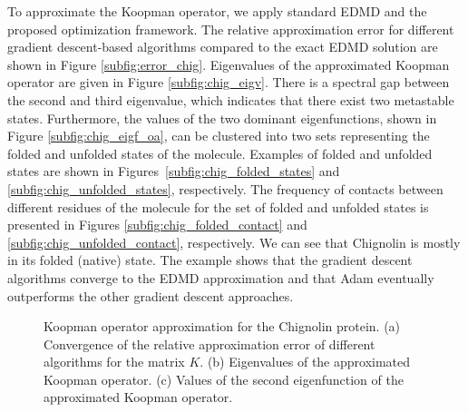 \documentclass
[
    a4paper,
    DIV=11,
    abstract=true,
    11pt,
]
{scrartcl}
\theoremstyle{definition}
\begin{document}
To approximate the Koopman operator, we apply standard EDMD and the proposed optimization framework. The relative approximation error for different gradient descent-based algorithms compared to the exact EDMD solution are shown in Figure \ref{subfig:error_chig}. Eigenvalues of the approximated Koopman operator are given in Figure \ref{subfig:chig_eigv}. There is a spectral gap between the second and third eigenvalue, which indicates that there exist two metastable states. Furthermore, the values of the two dominant eigenfunctions, shown in Figure \ref{subfig:chig_eigf_oa}, can be clustered into two sets representing the folded and unfolded states of the molecule. Examples of folded and unfolded states are shown in Figures~\ref{subfig:chig_folded_states} and \ref{subfig:chig_unfolded_states}, respectively. The frequency of contacts between different residues of the molecule for the set of folded and unfolded states is presented in Figures \ref{subfig:chig_folded_contact} and \ref{subfig:chig_unfolded_contact}, respectively. We can see that Chignolin is mostly in its folded (native) state. The example shows that the gradient descent algorithms converge to the EDMD approximation and that Adam eventually outperforms the other gradient descent approaches.

\begin{figure}
    \centering
    \quad
    \quad
    \quad
    \caption{Koopman operator approximation for the Chignolin protein. (a) Convergence of the relative approximation error of different algorithms for the matrix $K$. (b) Eigenvalues of the approximated Koopman operator. (c) Values of the second eigenfunction of the approximated Koopman operator.}
    \label{fig:chig_results}
\end{figure}
\end{document}
